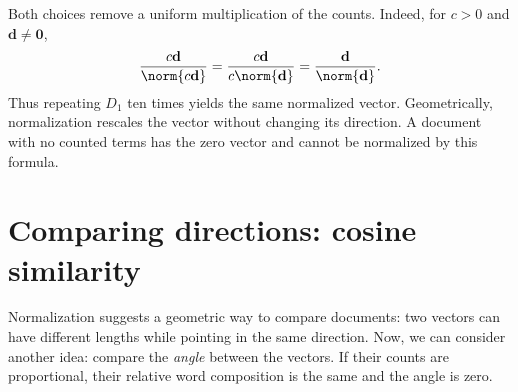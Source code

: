\documentclass[a4paper,12pt,oneside]{report}
\begin{document}
Both choices remove a uniform multiplication of the counts. Indeed,
for $c>0$ and $\mathbf d\neq\mathbf0$,
\[
  \frac{c\mathbf d}{\norm{c\mathbf d}}
  =\frac{c\mathbf d}{c\norm{\mathbf d}}
  =\frac{\mathbf d}{\norm{\mathbf d}}.
\]
Thus repeating $D_1$ ten times yields the same normalized vector.
Geometrically, normalization rescales the vector without changing its
direction. A document with no counted terms has the zero vector and
cannot be normalized by this formula.

\section{Comparing directions: cosine similarity}

Normalization suggests a geometric way to compare documents: two
vectors can have different lengths while pointing in the same direction.
Now, we can consider another idea: compare the \emph{angle} between
the vectors. If their counts are proportional, their relative word
composition is the same and the angle is zero.
\end{document}
